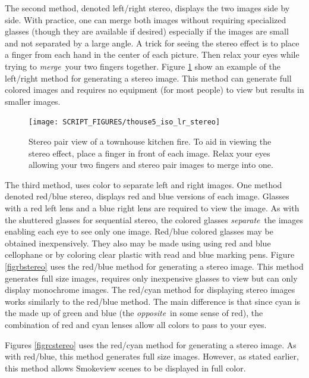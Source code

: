 \documentclass[11pt,twoside]{book}
\newcommand{\figoptions}{hbp}
\begin{document}
The second method, denoted left/right stereo, displays the two images side by side.  With practice, one can merge both images without requiring specialized glasses (though they are available if desired) especially if the images are small and not separated by a large angle.
A trick for seeing the stereo effect is to place a finger from each hand in the center of each picture.  Then relax your eyes while trying to {\em merge}\ your two fingers together.  Figure \ref{figlrstereo} show an example of the left/right method for generating a stereo image.  This method can generate full colored images and requires no equipment (for most people) to view but results in smaller images.
\begin{figure}[\figoptions]
\begin{center}
\texttt{[image: SCRIPT\_FIGURES/thouse5\_iso\_lr\_stereo]}
\caption[Stereo pair view of a townhouse kitchen fire.]{
Stereo pair view of a townhouse kitchen fire. To aid in viewing the stereo effect, place
a finger in front of each image.  Relax your eyes allowing your two fingers and stereo pair
images to merge into one.
}
\label{figlrstereo}
\end{center}
\end{figure}

The third method, uses color to separate left and right images.  One method denoted red/blue stereo, displays red and blue versions of each image.  Glasses with a red left lens and a blue right lens are required to view the image.  As with the shuttered glasses for sequential stereo, the colored glasses {\em separate}\ the images enabling each eye to see only one image.  Red/blue colored glasses may be obtained inexpensively.
They also may be made using using red and blue cellophane or by coloring clear plastic with read and blue marking pens.  Figure \ref{figrbstereo} uses the red/blue method for generating a stereo image.  This method generates full size images, requires only inexpensive glasses to view but can only display monochrome images.
The red/cyan method for displaying stereo images works similarly to the red/blue method.  The main difference is that since cyan is the made up of green and blue (the {\em opposite}\ in some sense of red), the combination of red and cyan lenses allow all colors to pass to your eyes.

Figures \ref{figrcstereo} uses the red/cyan method for generating a stereo image.  As with red/blue, this method generates full size images.  However, as stated earlier, this method allows Smokeview scenes to be displayed in full color.
\end{document}
